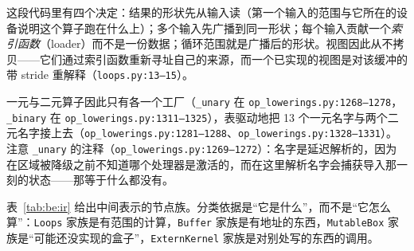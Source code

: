 这段代码里有四个决定：结果的形状先从输入读（第一个输入的范围与它所在的设备说明这个算子跑在什么上）；多个输入先广播到同一形状；每个输入贡献一个\emph{索引函数}（loader）而不是一份数据；循环范围就是广播后的形状。视图因此从不拷贝——它们通过索引函数重新寻址自己的来源，而一个已实现的视图是对该缓冲的带 stride 重解释（\texttt{loops.py:13--15}）。

一元与二元算子因此只有各一个工厂（\texttt{\_unary} 在 \texttt{op\_lowerings.py:1268--1278}，\texttt{\_binary} 在 \texttt{op\_lowerings.py:1311--1325}），表驱动地把 13 个一元名字与两个二元名字接上去（\texttt{op\_lowerings.py:1281--1288}、\texttt{op\_lowerings.py:1328--1331}）。注意 \texttt{\_unary} 的注释（\texttt{op\_lowerings.py:1269--1272}）：名字是延迟解析的，因为在区域被降级之前不知道哪个处理器是激活的，而在这里解析名字会捕获导入那一刻的状态——那等于什么都没有。

表~\ref{tab:be:ir} 给出中间表示的节点族。分类依据是“它是什么”，而不是“它怎么算”：\texttt{Loops} 家族是有范围的计算，\texttt{Buffer} 家族是有地址的东西，\texttt{MutableBox} 家族是“可能还没实现的盒子”，\texttt{ExternKernel} 家族是对别处写的东西的调用。

